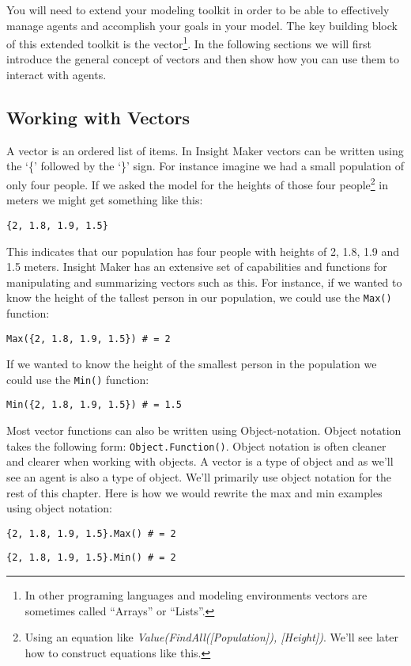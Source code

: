 \documentclass[]{memoir}
\begin{document}
You will need to extend your modeling toolkit in order to be able to
effectively manage agents and accomplish your goals in your model. The
key building block of this extended toolkit is the vector\footnote{In
  other programing languages and modeling environments vectors are
  sometimes called ``Arrays'' or ``Lists''.}. In the following sections
we will first introduce the general concept of vectors and then show how
you can use them to interact with agents.

\subsection{Working with Vectors}

A vector is an ordered list of items. In Insight Maker vectors can be
written using the `\{' followed by the `\}' sign. For instance imagine
we had a small population of only four people. If we asked the model for
the heights of those four people\footnote{Using an equation like
  \emph{Value(FindAll({[}Population{]}), {[}Height{]})}. We'll see later
  how to construct equations like this.} in meters we might get
something like this:

\lstinline!{2, 1.8, 1.9, 1.5}!

This indicates that our population has four people with heights of 2,
1.8, 1.9 and 1.5 meters. Insight Maker has an extensive set of
capabilities and functions for manipulating and summarizing vectors such
as this. For instance, if we wanted to know the height of the tallest
person in our population, we could use the \lstinline!Max()! function:

\lstinline!Max({2, 1.8, 1.9, 1.5}) # = 2!

If we wanted to know the height of the smallest person in the population
we could use the \lstinline!Min()! function:

\lstinline!Min({2, 1.8, 1.9, 1.5}) # = 1.5!

Most vector functions can also be written using Object-notation. Object
notation takes the following form: \lstinline!Object.Function()!. Object
notation is often cleaner and clearer when working with objects. A
vector is a type of object and as we'll see an agent is also a type of
object. We'll primarily use object notation for the rest of this
chapter. Here is how we would rewrite the max and min examples using
object notation:

\lstinline!{2, 1.8, 1.9, 1.5}.Max() # = 2!

\lstinline!{2, 1.8, 1.9, 1.5}.Min() # = 2!
\end{document}

